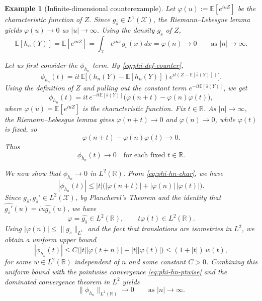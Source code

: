 \documentclass[12pt,leqno]{amsart}
\newtheorem{example}{Example}
\begin{document}
\begin{example}[Infinite-dimensional counterexample]
Let $\varphi(u) := \mathbb{E}[e^{iuZ}]$ be the characteristic function of $Z$.
Since $g_{\bar{s}}\in L^1(\mathcal{X})$, the Riemann--Lebesgue lemma yields
$\varphi(u)\to 0$ as $|u|\to\infty$.
Using the density $g_{\bar{s}}$ of $Z$,
\[
\mathbb{E}[h_n(Y)]
 = \mathbb{E}[e^{inZ}]
 = \int_{\mathcal{X}} e^{inx} g_{\bar{s}}(x)dx
 = \varphi(n)\longrightarrow 0
\qquad\text{as }|n|\to\infty.
\]

Let us first consider the $\phi_{h_n}$ term. By \eqref{eq:phi-def-counter},
\[
\phi_{h_n}(t)
 = it\,\mathbb{E}\big[(h_n(Y)-\mathbb{E}[h_n(Y)])e^{it(Z-\mathbb{E}[\bar{s}(Y)])}\big].
\]
Using the definition of $Z$ and pulling out the constant term $e^{-it\mathbb{E}[\bar{s}(Y)]}$, we get
\begin{equation}\label{eq:phi-hn-char}
\phi_{h_n}(t)
 = it\,e^{-it\mathbb{E}[\bar{s}(Y)]}\Big(\varphi(n+t) - \varphi(n)\varphi(t)\Big),
\end{equation}
where $\varphi(u) = \mathbb{E}[e^{iuZ}]$ is the characteristic function.
Fix $t\in\mathbb{R}$. As $|n|\to\infty$, the Riemann--Lebesgue lemma gives
$\varphi(n+t)\to 0$ and $\varphi(n)\to 0$, while $\varphi(t)$ is fixed, so
\[
\varphi(n+t) - \varphi(n)\varphi(t) \longrightarrow 0.
\]
Thus
\begin{equation}\label{eq:phi-hn-ptwise}
\phi_{h_n}(t) \longrightarrow 0
\quad\text{for each fixed }t\in\mathbb{R}.
\end{equation}

We now show that $\phi_{h_n}\to 0$ in $L^2(\mathbb{R})$. From
\eqref{eq:phi-hn-char}, we have
\[
|\phi_{h_n}(t)|
 \le |t|\big(|\varphi(n+t)| + |\varphi(n)|\,|\varphi(t)|\big).
\]
Since $g_{\bar{s}},g_{\bar{s}}' \in L^2(\mathcal{X})$, by Plancherel’s Theorem \citep[Chapter 6, Theorem 2.4]{stein2003fourier} and the identity that
$\widehat{g_{\bar{s}}'}(u) = iu\widehat{g_{\bar{s}}}(u)$, we have
\[
\varphi = \widehat{g_{\bar{s}}} \in L^2(\mathbb{R}),
\qquad
t\varphi(t) \in L^2(\mathbb{R}).
\]
Using $|\varphi(n)|\le \|g_{\bar{s}}\|_{L^1}$ and the fact that translations are isometries
in $L^2$, we obtain a uniform upper bound
\[
|\phi_{h_n}(t)|
 \le C\Big(|t||\varphi(t+n)| + |t||\varphi(t)|\Big)
 \le (1+|t|)\,w(t),
\]
for some $w\in L^2(\mathbb{R})$ independent of $n$ and some constant $C>0$.
Combining this uniform bound with the pointwise convergence
\eqref{eq:phi-hn-ptwise} and the dominated convergence theorem in $L^2$ yields
\begin{equation}\label{eq:phi-hn-L2}
\|\phi_{h_n}\|_{L^2(\mathbb{R})} \longrightarrow 0
\qquad\text{as }|n|\to\infty.
\end{equation}


\end{example}
\end{document}
